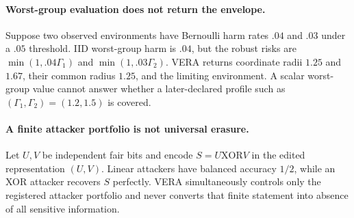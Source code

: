 \paragraph{Worst-group evaluation does not return the envelope.}
Suppose two observed environments have Bernoulli harm rates $.04$ and $.03$
under a $.05$ threshold. IID worst-group harm is $.04$, but the robust risks
are $\min(1,.04\Gamma_1)$ and $\min(1,.03\Gamma_2)$. VERA returns coordinate
radii $1.25$ and $1.67$, their common radius $1.25$, and the limiting
environment. A scalar worst-group value cannot answer whether a later-declared
profile such as $(\Gamma_1,\Gamma_2)=(1.2,1.5)$ is covered.

\paragraph{A finite attacker portfolio is not universal erasure.}
Let $U,V$ be independent fair bits and encode $S=U\mathbin{\mathrm{XOR}}V$ in
the edited representation $(U,V)$. Linear attackers have balanced accuracy
$1/2$, while an XOR attacker recovers $S$ perfectly. VERA simultaneously
controls only the registered attacker portfolio and never converts that finite
statement into absence of all sensitive information.
